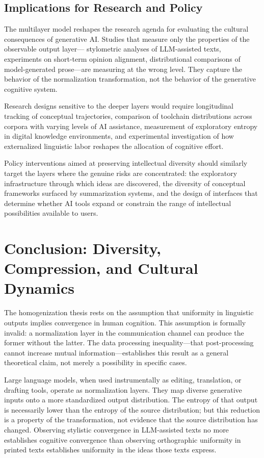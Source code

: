 \documentclass[12pt,a4paper]{article}
\theoremstyle{definition}
\theoremstyle{plain}
\theoremstyle{remark}
\begin{document}
\subsection{Implications for Research and Policy}

The multilayer model reshapes the research agenda for evaluating the cultural consequences of
generative AI. Studies that measure only the properties of the observable output layer---
stylometric analyses of LLM-assisted texts, experiments on short-term opinion alignment,
distributional comparisons of model-generated prose---are measuring at the wrong level. They
capture the behavior of the normalization transformation, not the behavior of the generative
cognitive system.

Research designs sensitive to the deeper layers would require longitudinal tracking of
conceptual trajectories, comparison of toolchain distributions across corpora with varying
levels of AI assistance, measurement of exploratory entropy in digital knowledge environments,
and experimental investigation of how externalized linguistic labor reshapes the allocation
of cognitive effort.

Policy interventions aimed at preserving intellectual diversity should similarly target the
layers where the genuine risks are concentrated: the exploratory infrastructure through which
ideas are discovered, the diversity of conceptual frameworks surfaced by summarization
systems, and the design of interfaces that determine whether AI tools expand or constrain the
range of intellectual possibilities available to users.

\section{Conclusion: Diversity, Compression, and Cultural Dynamics}
\label{sec:conclusion}

The homogenization thesis rests on the assumption that uniformity in linguistic outputs
implies convergence in human cognition. This assumption is formally invalid: a normalization
layer in the communication channel can produce the former without the latter. The data
processing inequality---that post-processing cannot increase mutual information---establishes
this result as a general theoretical claim, not merely a possibility in specific cases.

Large language models, when used instrumentally as editing, translation, or drafting tools,
operate as normalization layers. They map diverse generative inputs onto a more standardized
output distribution. The entropy of that output is necessarily lower than the entropy of the
source distribution; but this reduction is a property of the transformation, not evidence
that the source distribution has changed. Observing stylistic convergence in LLM-assisted
texts no more establishes cognitive convergence than observing orthographic uniformity in
printed texts establishes uniformity in the ideas those texts express.
\end{document}
